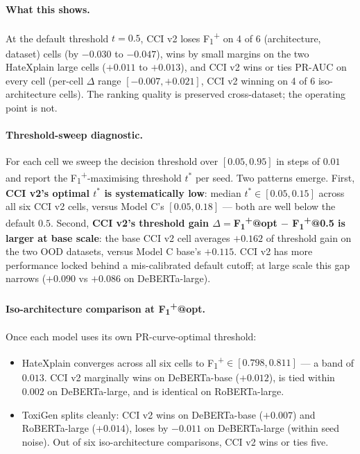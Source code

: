 \documentclass[10pt,a4paper]{article}
\begin{document}
\paragraph{What this shows.} At the default threshold $t{=}0.5$, CCI v2 loses
F\textsubscript{1}\textsuperscript{+} on 4 of 6 (architecture, dataset) cells
(by $-0.030$ to $-0.047$), wins by small margins on the two HateXplain large
cells ($+0.011$ to $+0.013$), and CCI v2 wins or ties PR-AUC on every cell
(per-cell $\Delta$ range $[-0.007, +0.021]$, CCI v2 winning on 4 of 6 iso-architecture cells).
The ranking quality is preserved cross-dataset; the operating point is not.

\paragraph{Threshold-sweep diagnostic.} For each cell we sweep the decision
threshold over $[0.05, 0.95]$ in steps of $0.01$ and report the
F\textsubscript{1}\textsuperscript{+}-maximising threshold $t^*$ per seed.
Two patterns emerge. First, \textbf{CCI v2's optimal $t^*$ is systematically
low}: median $t^* \in [0.05, 0.15]$ across all six CCI v2 cells, versus
Model C's $[0.05, 0.18]$ --- both are well below the default $0.5$. Second,
\textbf{CCI v2's threshold gain $\Delta=$F\textsubscript{1}\textsuperscript{+}@opt
$-$ F\textsubscript{1}\textsuperscript{+}@0.5 is larger at base scale}: the
base CCI v2 cell averages $+0.162$ of threshold gain on the two OOD datasets,
versus Model C base's $+0.115$. CCI v2 has more performance locked behind a
mis-calibrated default cutoff; at large scale this gap narrows
(${+}0.090$ vs ${+}0.086$ on DeBERTa-large).

\paragraph{Iso-architecture comparison at F\textsubscript{1}\textsuperscript{+}@opt.}
Once each model uses its own PR-curve-optimal threshold:
\begin{itemize}[leftmargin=*,itemsep=1pt]
    \item HateXplain converges across all six cells to F\textsubscript{1}\textsuperscript{+}$\in[0.798, 0.811]$
    --- a band of $0.013$. CCI v2 marginally wins on DeBERTa-base ($+0.012$),
    is tied within $0.002$ on DeBERTa-large, and is identical on RoBERTa-large.
    \item ToxiGen splits cleanly: CCI v2 wins on DeBERTa-base ($+0.007$) and
    RoBERTa-large ($+0.014$), loses by $-0.011$ on DeBERTa-large (within seed noise).
    Out of six iso-architecture comparisons, CCI v2 wins or ties five.
\end{itemize}
\end{document}
